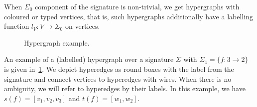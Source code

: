 \begin{remark}
When $\Sigma_0$ component of the signature is non-trivial, we get hypergraphs with coloured or typed vertices, that is, such hypergraphs additionally have a labelling function $l_{V} : V \to \Sigma_0$ on vertices.
\end{remark}

\begin{figure}
\centering
{}
\caption{Hypergraph example.}
\label{fig:hypergraph_example_1}
\end{figure}

\begin{example}
An example of a (labelled) hypergraph over a signature $\Sigma$ with $\Sigma_1 = \{f : 3 \to 2\}$ is given in~\cref{fig:hypergraph_example_1}.
We depict hyperedges as round boxes with the label from the signature and connect vertices to hyperedges with wires.
When there is no ambiguity, we will refer to hyperedges by their labels.
In this example, we have $s(f) = [v_1, v_2, v_3]$ and $t(f) = [w_1, w_2]$.
\end{example}

